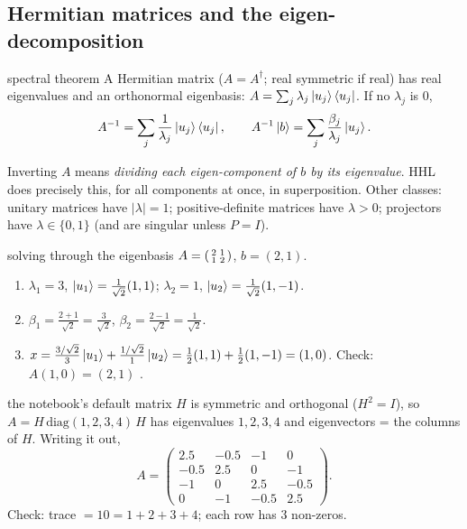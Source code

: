 \documentclass[11pt,a4paper,openany]{book}
\newcounter{wex}[chapter]
\newenvironment{steps}{\begin{enumerate}[label=\textbf{Step \arabic*.}, leftmargin=4.2em, itemsep=2pt]}{\end{enumerate}}
\begin{document}
\subsection{Hermitian matrices and the eigen-decomposition}
\begin{keyres}{spectral theorem}
A Hermitian matrix ($A = A^\dagger$; real symmetric if real) has real eigenvalues and an orthonormal eigenbasis:
$A = \sum_j\lambda_j\ket{u_j}\bra{u_j}$. If no $\lambda_j$ is $0$,
\[ A^{-1} = \sum_j\frac{1}{\lambda_j}\ket{u_j}\bra{u_j},\qquad A^{-1}\ket b = \sum_j\frac{\beta_j}{\lambda_j}\ket{u_j}. \]
\end{keyres}
Inverting $A$ means \emph{dividing each eigen-component of $b$ by its eigenvalue}. HHL does precisely this, for all components at once, in
superposition. Other classes: unitary matrices have $|\lambda| = 1$; positive-definite matrices have $\lambda > 0$; projectors have $\lambda\in\{0, 1\}$
(and are singular unless $P = I$).
\begin{wexample}{solving through the eigenbasis}
$A = \begin{psmallmatrix}2&1\\1&2\end{psmallmatrix}$, $b = (2, 1)$.
\begin{steps}
\item $\lambda_1 = 3$, $\ket{u_1} = \frac{1}{\sqrt2}(1, 1)$; $\lambda_2 = 1$, $\ket{u_2} = \frac{1}{\sqrt2}(1, -1)$.
\item $\beta_1 = \frac{2 + 1}{\sqrt2} = \frac{3}{\sqrt2}$, $\beta_2 = \frac{2 - 1}{\sqrt2} = \frac{1}{\sqrt2}$.
\item $x = \frac{3/\sqrt2}{3}\ket{u_1} + \frac{1/\sqrt2}{1}\ket{u_2} = \frac12(1, 1) + \frac12(1, -1) = (1, 0)$. Check: $A(1, 0) = (2, 1)$ \checkmark.
\end{steps}
\end{wexample}
\begin{wexample}{the notebook's default matrix}
$H$ is symmetric and orthogonal ($H^2 = I$), so $A = H\,\mathrm{diag}(1, 2, 3, 4)\,H$ has eigenvalues $1, 2, 3, 4$ and eigenvectors = the columns of $H$.
Writing it out,
\[ A = \begin{pmatrix} 2.5 & -0.5 & -1 & 0\\ -0.5 & 2.5 & 0 & -1\\ -1 & 0 & 2.5 & -0.5\\ 0 & -1 & -0.5 & 2.5\end{pmatrix}. \]
Check: trace $= 10 = 1 + 2 + 3 + 4$; each row has 3 non-zeros.
\end{wexample}
\end{document}

